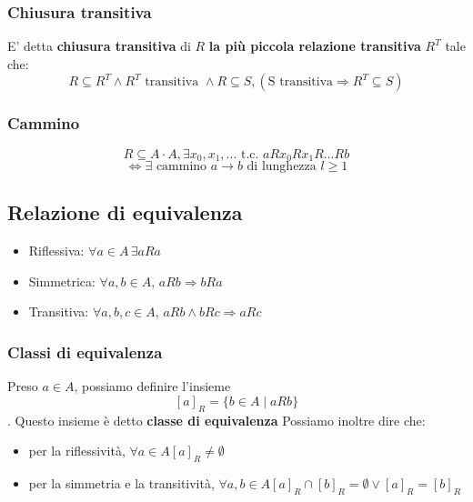 \documentclass{report}
\begin{document}
        \subsubsection{Chiusura transitiva}
            E' detta \textbf{chiusura transitiva} di $R$ \textbf{la più piccola 
            relazione transitiva} $R^T$ tale che:
            $$R \subseteq R^T \wedge R^T \textrm{ transitiva } \wedge R \subseteq S, \left(\textrm{S transitiva} \Longrightarrow R^T \subseteq S\right)$$
        \subsubsection{Cammino}
            $$R \subseteq A \cdot A, \exists x_0, x_1, ... \textrm{ t.c. } aRx_0Rx_1R...Rb$$
            $$\Longleftrightarrow \exists \textrm{ cammino } a \rightarrow b \textrm{ di lunghezza } l \geq 1$$
    \subsection{Relazione di equivalenza}
        \begin{itemize}
            \item Riflessiva: $\forall a \in A \, \exists aRa$
            \item Simmetrica: $\forall a,b \in A, \, aRb \Longrightarrow bRa$
            \item Transitiva: $\forall a,b,c \in A, \, aRb \wedge bRc \Longrightarrow aRc$
        \end{itemize} 
        \subsubsection{Classi di equivalenza}
            Preso $a \in A$, possiamo definire l'insieme 
                $$\left[a\right]_R = \{b \in A \mid aRb\}$$. 
            Questo insieme è detto \textbf{classe di equivalenza}
            Possiamo inoltre dire che:
            \begin{itemize}
                \item per la riflessività, $\forall a \in A \left[a\right]_R \neq \emptyset$
                \item per la simmetria e la transitività, 
                    $\forall a, b \in A \left[a\right]_R \cap \left[b\right]_R = \emptyset \vee \left[a\right]_R = \left[b\right]_R$
            \end{itemize}
\end{document}
